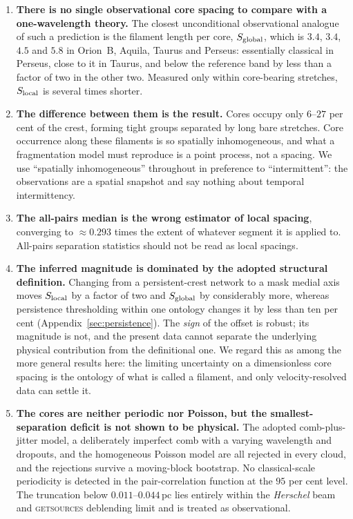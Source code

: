 \documentclass[usenatbib,twoside,twocolumn]{mnras}
\begin{document}
\begin{enumerate}\setlength{\itemsep}{2pt}
\item \textbf{There is no single observational core spacing to compare with a one-wavelength theory.} The closest unconditional observational analogue of such a prediction is the filament length per core, $S_{\rm global}$, which is $3.4$, $3.4$, $4.5$ and $5.8$ in Orion~B, Aquila, Taurus and Perseus: essentially classical in Perseus, close to it in Taurus, and below the reference band by less than a factor of two in the other two. Measured only within core-bearing stretches, $S_{\rm local}$ is several times shorter.
\item \textbf{The difference between them is the result.} Cores occupy only $6$--$27$ per cent of the crest, forming tight groups separated by long bare stretches. Core occurrence along these filaments is so spatially inhomogeneous, and what a fragmentation model must reproduce is a point process, not a spacing. We use ``spatially inhomogeneous'' throughout in preference to ``intermittent'': the observations are a spatial snapshot and say nothing about temporal intermittency.
\item \textbf{The all-pairs median is the wrong estimator of local spacing}, converging to $\approx0.293$ times the extent of whatever segment it is applied to. All-pairs separation statistics should not be read as local spacings.
\item \textbf{The inferred magnitude is dominated by the adopted structural definition.} Changing from a persistent-crest network to a mask medial axis moves $S_{\rm local}$ by a factor of two and $S_{\rm global}$ by considerably more, whereas persistence thresholding within one ontology changes it by less than ten per cent (Appendix~\ref{sec:persistence}). The \emph{sign} of the offset is robust; its magnitude is not, and the present data cannot separate the underlying physical contribution from the definitional one. We regard this as among the more general results here: the limiting uncertainty on a dimensionless core spacing is the ontology of what is called a filament, and only velocity-resolved data can settle it.
\item \textbf{The cores are neither periodic nor Poisson, but the smallest-separation deficit is not shown to be physical.} The adopted comb-plus-jitter model, a deliberately imperfect comb with a varying wavelength and dropouts, and the homogeneous Poisson model are all rejected in every cloud, and the rejections survive a moving-block bootstrap. No classical-scale periodicity is detected in the pair-correlation function at the $95$ per cent level. The truncation below $0.011$--$0.044$\,pc lies entirely within the \textit{Herschel} beam and \textsc{getsources} deblending limit and is treated as observational.

\end{enumerate}
\end{document}
